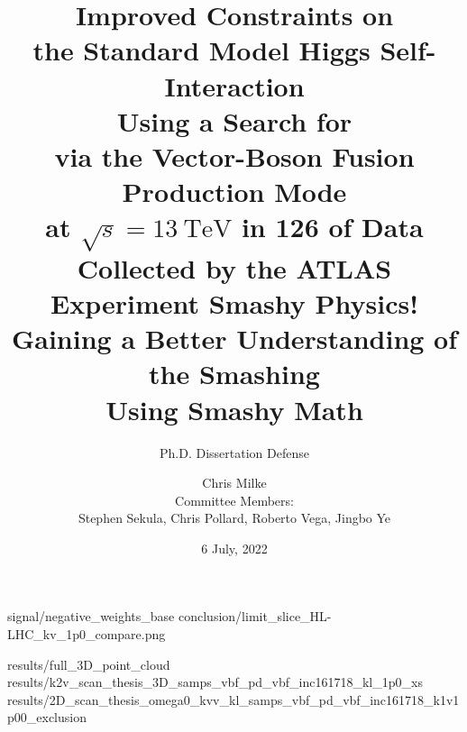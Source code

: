 \documentclass{beamer}
\begin{document}
\title{
    Improved Constraints on \\the Standard Model Higgs Self-Interaction \\
    Using a Search for \hhbbbb \\via the Vector-Boson Fusion Production Mode \\
    at $\sqrt{s}=13~\mathrm{TeV}$ in 126 \ifb of Data \\Collected by the ATLAS Experiment
}
\subtitle{\vspace{3mm}Ph.D. Dissertation Defense}

\author{Chris Milke\\{\small Committee Members:\\Stephen Sekula, Chris Pollard, Roberto Vega, Jingbo Ye}}
\date{6 July, 2022}

\frame{\titlepage}
\title{
    Smashy Physics!\\Gaining a Better Understanding of the Smashing\\Using Smashy Math
}
\frame{\titlepage}
%

%
%

{signal/negative_weights_base}
{conclusion/limit_slice_HL-LHC_kv_1p0_compare.png}

{results/full_3D_point_cloud}
{results/k2v_scan_thesis_3D_samps_vbf_pd_vbf_inc161718_kl_1p0_xs}
{results/2D_scan_thesis_omega0_kvv_kl_samps_vbf_pd_vbf_inc161718_k1v1p00_exclusion}


%
%
%
%
\end{document}
